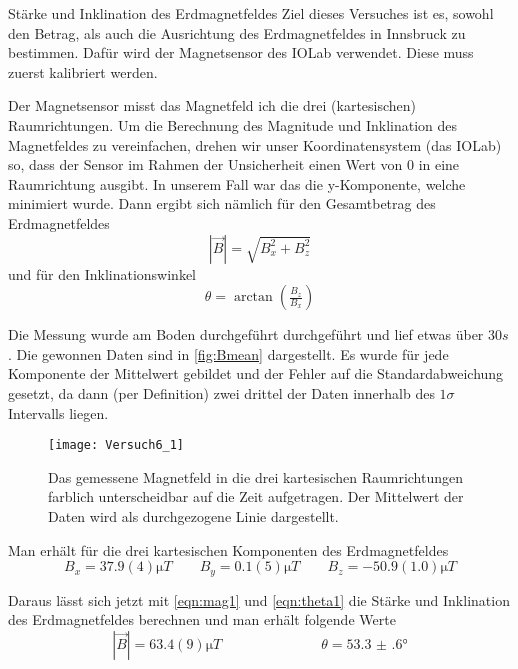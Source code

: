 \documentclass{alex_gp}
\begin{document}
\renewcommand{\labelenumi}{\alph{enumi})}


\begin{mybox}{Stärke und Inklination des Erdmagnetfeldes}
	Ziel dieses Versuches ist es, sowohl den Betrag, als auch die Ausrichtung des Erdmagnetfeldes in Innsbruck zu bestimmen. Dafür wird der Magnetsensor  des IOLab verwendet. Diese muss zuerst kalibriert werden. 
	
	Der Magnetsensor misst das Magnetfeld ich die drei (kartesischen) Raumrichtungen. Um die Berechnung des Magnitude und Inklination des Magnetfeldes zu vereinfachen, drehen wir unser Koordinatensystem (das IOLab) so, dass der Sensor im Rahmen der Unsicherheit einen Wert von 0 in eine Raumrichtung ausgibt. In unserem Fall war das die y-Komponente, welche minimiert wurde. Dann ergibt sich nämlich für den Gesamtbetrag des Erdmagnetfeldes 
	\begin{equation}\label{eqn:mag1}
		|\vec{B}| = \sqrt{B_x^2 + B_z^2}
	\end{equation}
	und für den Inklinationswinkel
	\begin{equation}\label{eqn:theta1}
		\theta = \arctan(\tfrac{B_z}{B_x})
	\end{equation}
	
	Die Messung wurde am Boden durchgeführt durchgeführt und lief etwas über \( 30 \unit{s} \). Die gewonnen Daten sind in \autoref{fig:Bmean} dargestellt. Es wurde für jede Komponente der Mittelwert gebildet und der Fehler auf die Standardabweichung gesetzt, da dann (per Definition) zwei drittel der Daten innerhalb des \( 1\sigma \) Intervalls liegen. 
	
	\begin{figure}[H]	
		\centering
		\texttt{[image: Versuch6\_1]}
		\caption{Das gemessene Magnetfeld in die drei kartesischen Raumrichtungen farblich unterscheidbar auf die Zeit aufgetragen. Der Mittelwert der Daten wird als durchgezogene Linie dargestellt.}
		\label{fig:Bmean}
	\end{figure}
	
	Man erhält für die drei kartesischen Komponenten des Erdmagnetfeldes
	\begin{equation}\label{eqn:Bxyz}
		B_x = 37.9(4) \unit{\micro T} \qquad B_y = 0.1(5) \unit{\micro T} \qquad B_z = -50.9(1.0) \unit{\micro T}
	\end{equation}

	Daraus lässt sich jetzt mit \autoref{eqn:mag1} und \autoref{eqn:theta1} die Stärke und Inklination des Erdmagnetfeldes berechnen und man erhält folgende Werte
	\begin{equation}\label{eqn:results}
		|\vec{B}| = 63.4(9) \unit{\micro T} \hspace{3cm} \theta = \ang{53.3(6)}
	\end{equation}
	

\end{mybox}
\end{document}
